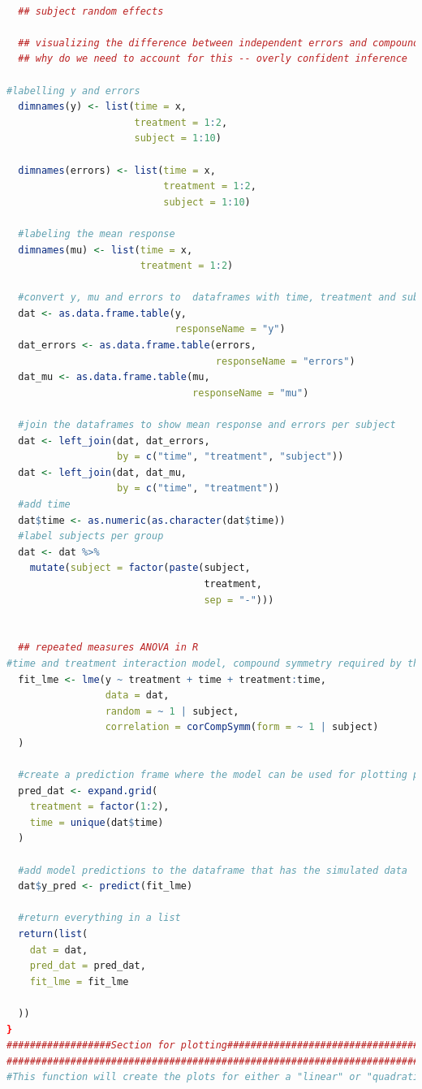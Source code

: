 \documentclass[
]{article}
\begin{document}
\begin{lstlisting}[language=R]
  
  ## subject random effects
  
  ## visualizing the difference between independent errors and compound symmetry
  ## why do we need to account for this -- overly confident inference
  
#labelling y and errors  
  dimnames(y) <- list(time = x, 
                      treatment = 1:2, 
                      subject = 1:10)

  dimnames(errors) <- list(time = x, 
                           treatment = 1:2, 
                           subject = 1:10)
  
  #labeling the mean response
  dimnames(mu) <- list(time = x, 
                       treatment = 1:2)
  
  #convert y, mu and errors to  dataframes with time, treatment and subject columns
  dat <- as.data.frame.table(y, 
                             responseName = "y")
  dat_errors <- as.data.frame.table(errors, 
                                    responseName = "errors")
  dat_mu <- as.data.frame.table(mu, 
                                responseName = "mu")
  
  #join the dataframes to show mean response and errors per subject
  dat <- left_join(dat, dat_errors, 
                   by = c("time", "treatment", "subject"))
  dat <- left_join(dat, dat_mu, 
                   by = c("time", "treatment"))
  #add time
  dat$time <- as.numeric(as.character(dat$time))
  #label subjects per group
  dat <- dat %>%
    mutate(subject = factor(paste(subject, 
                                  treatment, 
                                  sep = "-")))
  
  
  ## repeated measures ANOVA in R
#time and treatment interaction model, compound symmetry required by the model
  fit_lme <- lme(y ~ treatment + time + treatment:time,
                 data = dat,
                 random = ~ 1 | subject,
                 correlation = corCompSymm(form = ~ 1 | subject)
  )
  
  #create a prediction frame where the model can be used for plotting purposes
  pred_dat <- expand.grid(
    treatment = factor(1:2), 
    time = unique(dat$time)
  )
  
  #add model predictions to the dataframe that has the simulated data
  dat$y_pred <- predict(fit_lme)
  
  #return everything in a list
  return(list(
    dat = dat,
    pred_dat = pred_dat,
    fit_lme = fit_lme
    
  ))
}
##################Section for plotting#################################
#######################################################################
#This function will create the plots for either a "linear" or "quadratic" response


\end{lstlisting}
\end{document}
